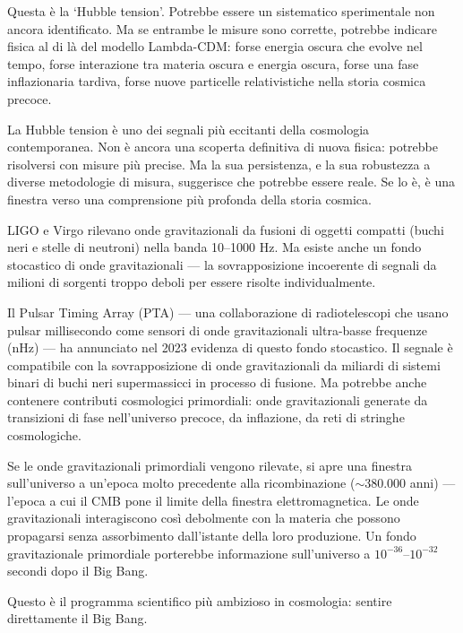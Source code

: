 \documentclass[12pt,a4paper,openany]{book}
\newcommand{\sezione}[1]{\vspace{1.2em}{\large\bfseries #1}\vspace{0.5em}\par}
\begin{document}
Questa è la `Hubble tension'. Potrebbe essere un sistematico sperimentale non ancora identificato. Ma se entrambe le misure sono corrette, potrebbe indicare fisica al di là del modello Lambda-CDM: forse energia oscura che evolve nel tempo, forse interazione tra materia oscura e energia oscura, forse una fase inflazionaria tardiva, forse nuove particelle relativistiche nella storia cosmica precoce.

La Hubble tension è uno dei segnali più eccitanti della cosmologia contemporanea. Non è ancora una scoperta definitiva di nuova fisica: potrebbe risolversi con misure più precise. Ma la sua persistenza, e la sua robustezza a diverse metodologie di misura, suggerisce che potrebbe essere reale. Se lo è, è una finestra verso una comprensione più profonda della storia cosmica.

\sezione{Le onde gravitazionali cosmologiche: ascoltare il Big Bang}

LIGO e Virgo rilevano onde gravitazionali da fusioni di oggetti compatti (buchi neri e stelle di neutroni) nella banda 10--1000 Hz. Ma esiste anche un fondo stocastico di onde gravitazionali --- la sovrapposizione incoerente di segnali da milioni di sorgenti troppo deboli per essere risolte individualmente.

Il Pulsar Timing Array (PTA) --- una collaborazione di radiotelescopi che usano pulsar millisecondo come sensori di onde gravitazionali ultra-basse frequenze (nHz) --- ha annunciato nel 2023 evidenza di questo fondo stocastico. Il segnale è compatibile con la sovrapposizione di onde gravitazionali da miliardi di sistemi binari di buchi neri supermassicci in processo di fusione. Ma potrebbe anche contenere contributi cosmologici primordiali: onde gravitazionali generate da transizioni di fase nell'universo precoce, da inflazione, da reti di stringhe cosmologiche.

Se le onde gravitazionali primordiali vengono rilevate, si apre una finestra sull'universo a un'epoca molto precedente alla ricombinazione ($\sim$380.000 anni) --- l'epoca a cui il CMB pone il limite della finestra elettromagnetica. Le onde gravitazionali interagiscono così debolmente con la materia che possono propagarsi senza assorbimento dall'istante della loro produzione. Un fondo gravitazionale primordiale porterebbe informazione sull'universo a $10^{-36}$--$10^{-32}$ secondi dopo il Big Bang.

Questo è il programma scientifico più ambizioso in cosmologia: sentire direttamente il Big Bang.
\end{document}
